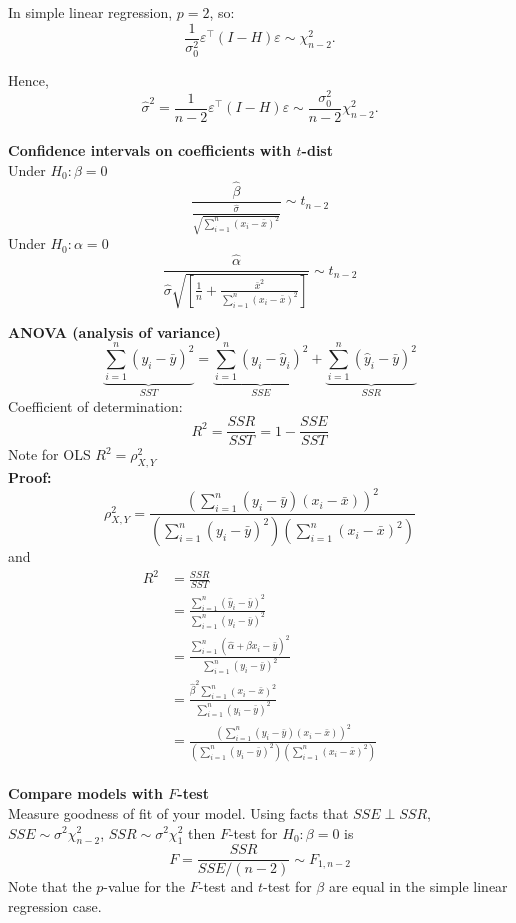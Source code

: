 \documentclass{article}
\begin{document}
In simple linear regression, \( p = 2 \), so:
\[
  \frac{1}{\sigma_0^2}\varepsilon^\top (I - H)\varepsilon \sim \chi^2_{n - 2}.
\]

Hence,
\[
  \hat{\sigma}^2 = \frac{1}{n - 2} \varepsilon^\top (I - H)\varepsilon \sim \frac{\sigma_0^2}{n - 2} \chi^2_{n - 2}.
\]\\

\textbf{Confidence intervals on coefficients with $t$-dist}\\
Under $H_0: \beta = 0$
\[ \frac{\hat{\beta}}{\frac{\hat{\sigma}}{\sqrt{\sum_{i=1}^{n}(x_i - \bar{x})^2}}} \sim t_{n-2} \]
Under $H_0: \alpha = 0$
\[ \frac{\hat{\alpha}}{\hat{\sigma}\sqrt{\left[ \frac{1}{n} + \frac{\bar{x}^2}{\sum_{i=1}^{n}(x_i - \bar{x})^2}\right]}} \sim t_{n-2} \]

\textbf{ANOVA (analysis of variance)}\\
\[ \underbrace{\sum_{i=1}^{n} (y_i - \bar{y})^2}_{SST} = \underbrace{\sum_{i=1}^{n} (y_i - \hat{y}_i)^2}_{SSE} + \underbrace{\sum_{i=1}^{n} (\hat{y}_i - \bar{y})^2}_{SSR}\]
Coefficient of determination:
\[ R^2 = \frac{SSR}{SST} = 1 - \frac{SSE}{SST} \]
Note for OLS $R^2 = \rho^2_{X, Y}$ \\
\textbf{Proof:}
\[ \rho^2_{X, Y} =  \frac{(\sum_{i=1}^{n}(y_i - \bar{y})(x_i - \bar{x}))^2}{(\sum_{i=1}^{n} (y_i - \bar{y})^2)(\sum_{i=1}^{n} (x_i - \bar{x})^2)}\]
and
\begin{align*}
  R^2 &= \frac{SSR}{SST}\\
  &= \frac{\sum_{i=1}^{n} (\hat{y}_i - \bar{y})^2}{\sum_{i=1}^{n} (y_i - \bar{y})^2} \\
  &= \frac{\sum_{i=1}^{n} (\hat{\alpha} + \hat{\beta}x_i - \bar{y})^2}{\sum_{i=1}^{n} (y_i - \bar{y})^2} \\
  &= \frac{\hat{\beta}^2 \sum_{i=1}^{n} (x_i - \bar{x})^2}{\sum_{i=1}^{n} (y_i - \bar{y})^2} \\
  &= \frac{(\sum_{i=1}^{n}(y_i - \bar{y})(x_i - \bar{x}))^2}{(\sum_{i=1}^{n} (y_i - \bar{y})^2)(\sum_{i=1}^{n} (x_i - \bar{x})^2)}
\end{align*}
\\

\textbf{Compare models with $F$-test}\\
Measure goodness of fit of your model. Using facts that $SSE \perp SSR$,
$SSE \sim \sigma^2 \chi^2_{n-2}$, $SSR \sim \sigma^2 \chi^2_{1}$ then
$F$-test for $H_0: \beta=0$ is
\[ F = \frac{SSR}{SSE/(n-2)} \sim F_{1, n-2}\]
Note that the $p$-value for the $F$-test and $t$-test for $\beta$ are equal in the simple linear regression case.\\
\end{document}
